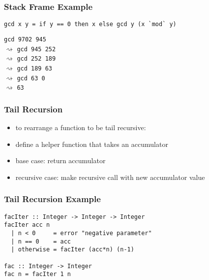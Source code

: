 \documentclass[dvipsnames]{beamer}
\theoremstyle{plain}
\begin{document}
\begin{frame}[fragile]
  \frametitle{Stack Frame Example}

  \begin{lstlisting}
gcd x y = if y == 0 then x else gcd y (x `mod` y)
  \end{lstlisting}

  \lstinline{gcd 9702 945}\\
  $\rightsquigarrow$ \lstinline{gcd 945 252}\\
  $\rightsquigarrow$ \lstinline{gcd 252 189}\\
  $\rightsquigarrow$ \lstinline{gcd 189 63}\\
  $\rightsquigarrow$ \lstinline{gcd 63 0}\\
  $\rightsquigarrow$ \lstinline{63}\\
\end{frame}

\begin{frame}
  \frametitle{Tail Recursion}

  \begin{itemize}
    \item to rearrange a function to be tail recursive:

    \medskip
    \item define a helper function that takes an \alert{accumulator}
    \item base case: return accumulator
    \item recursive case: make recursive call with new accumulator value
  \end{itemize}
\end{frame}

\begin{frame}[fragile]
  \frametitle{Tail Recursion Example}

  \begin{lstlisting}
facIter :: Integer -> Integer -> Integer
facIter acc n
  | n < 0     = error "negative parameter"
  | n == 0    = acc
  | otherwise = facIter (acc*n) (n-1)

fac :: Integer -> Integer
fac n = facIter 1 n
  \end{lstlisting}
\end{frame}
\end{document}
